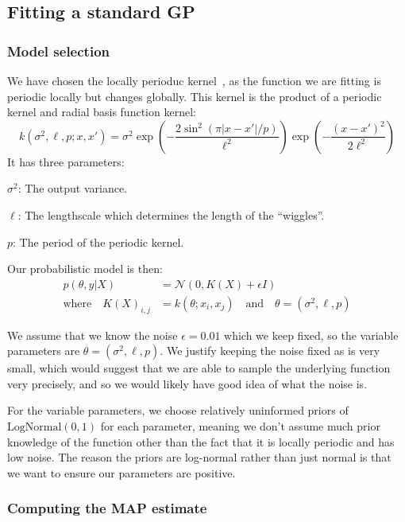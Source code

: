 \subsection{Fitting a standard GP}

\subsubsection{Model selection}

We have chosen the locally perioduc kernel~\cite[11]{duvenaud2014automatic},
as the function we are fitting is periodic locally but changes
globally. This kernel is the product of a periodic kernel and radial basis function kernel:
\[
  k( \sigma^2, \ell, p ; x, x')
  = \sigma^2
    \exp{\left(-\frac{2 \sin^2{(\pi | x - x' | / p)}}{\ell^2} \right)}
    \exp{\left( -\frac{(x - x')^2}{2 \ell^2} \right)}
\]
It has three parameters:
\begin{enumerate*}[label=(\alph*)]
  \item $\sigma^2$: The output variance.
  \item $\ell$: The lengthscale which determines the length of the \enquote{wiggles}.
  \item $p$: The period of the periodic kernel.
\end{enumerate*}
%
Our probabilistic model is then:
\begin{align*}
  p(\theta , y | X)
  &=
  \mathcal{N}(0, K(X) + \epsilon I)
  \\
  \text{where} \quad
  K(X)_{i,j} &= k(\theta ; x_i, x_j)
  \quad \text{and} \quad
  \theta = (\sigma^2, \ell, p)
\end{align*}

We assume that we know the noise $\epsilon = 0.01$ which we keep fixed,
so the variable parameters are $\theta = (\sigma^2, \ell, p)$.
We justify keeping the noise fixed as is very small,
which would suggest that we are able to sample the underlying function
very precisely, and so we would likely have good idea of what the noise is.

For the variable parameters, we choose relatively uninformed priors
of $\text{LogNormal}(0, 1)$ for each parameter, meaning we don't
assume much prior knowledge of the function other than the fact that
it is locally periodic and has low noise.
The reason the priors are log-normal rather than just normal
is that we want to ensure our parameters are positive.

\subsubsection{Computing the MAP estimate}

